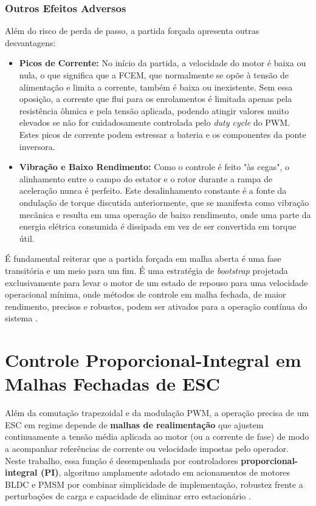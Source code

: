\subsubsection{Outros Efeitos Adversos}

Além do risco de perda de passo, a partida forçada apresenta outras desvantagens:

\begin{itemize}
    \item \textbf{Picos de Corrente:} No início da partida, a velocidade do motor é baixa ou nula, o que significa que a FCEM, que normalmente se opõe à tensão de alimentação e limita a corrente, também é baixa ou inexistente. Sem essa oposição, a corrente que flui para os enrolamentos é limitada apenas pela resistência ôhmica e pela tensão aplicada, podendo atingir valores muito elevados se não for cuidadosamente controlada pelo \textit{duty cycle} do PWM. Estes picos de corrente podem estressar a bateria e os componentes da ponte inversora.
    \item \textbf{Vibração e Baixo Rendimento:} Como o controle é feito "às cegas", o alinhamento entre o campo do estator e o rotor durante a rampa de aceleração nunca é perfeito. Este desalinhamento constante é a fonte da ondulação de torque discutida anteriormente, que se manifesta como vibração mecânica e resulta em uma operação de baixo rendimento, onde uma parte da energia elétrica consumida é dissipada em vez de ser convertida em torque útil.
\end{itemize}

É fundamental reiterar que a partida forçada em malha aberta é uma fase transitória e um meio para um fim. É uma estratégia de \textit{bootstrap} projetada exclusivamente para levar o motor de um estado de repouso para uma velocidade operacional mínima, onde métodos de controle em malha fechada, de maior rendimento, precisos e robustos, podem ser ativados para a operação contínua do sistema \cite{ti2022minimizing, nxp2023sensorless}.

\section{Controle Proporcional-Integral em Malhas Fechadas de ESC}
\label{sec:controle_pi}

Além da comutação trapezoidal e da modulação PWM, a operação precisa de um ESC em regime depende de \textbf{malhas de realimentação} que ajustem continuamente a tensão média aplicada ao motor (ou a corrente de fase) de modo a acompanhar referências de corrente ou velocidade impostas pelo operador. Neste trabalho, essa função é desempenhada por controladores \textbf{proporcional-integral (PI)}, algoritmo amplamente adotado em acionamentos de motores BLDC e PMSM por combinar simplicidade de implementação, robustez frente a perturbações de carga e capacidade de eliminar erro estacionário \cite{krishnan2010permanent, xia2012permanent, kim2017electric}.


